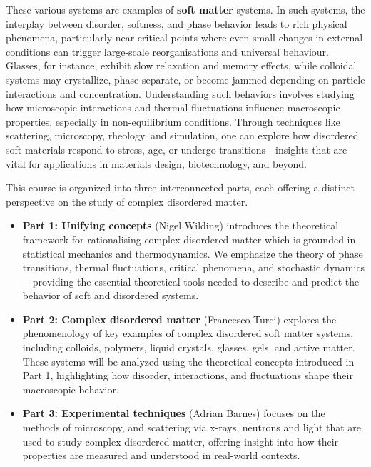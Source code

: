 \documentclass[
  letterpaper,
  DIV=11,
  numbers=noendperiod]{scrreprt}
\providecommand{\tightlist}{%
  \setlength{\itemsep}{0pt}\setlength{\parskip}{0pt}}\usepackage{longtable,booktabs,array}
\begin{document}
These various systems are examples of \textbf{soft matter} systems. In
such systems, the interplay between disorder, softness, and phase
behavior leads to rich physical phenomena, particularly near critical
points where even small changes in external conditions can trigger
large-scale reorganisations and universal behaviour. Glasses, for
instance, exhibit slow relaxation and memory effects, while colloidal
systems may crystallize, phase separate, or become jammed depending on
particle interactions and concentration. Understanding such behaviors
involves studying how microscopic interactions and thermal fluctuations
influence macroscopic properties, especially in non-equilibrium
conditions. Through techniques like scattering, microscopy, rheology,
and simulation, one can explore how disordered soft materials respond to
stress, age, or undergo transitions---insights that are vital for
applications in materials design, biotechnology, and beyond.

This course is organized into three interconnected parts, each offering
a distinct perspective on the study of complex disordered matter.

\begin{itemize}
\tightlist
\item
  \textbf{Part 1: Unifying concepts} (Nigel Wilding) introduces the
  theoretical framework for rationalising complex disordered matter
  which is grounded in statistical mechanics and thermodynamics. We
  emphasize the theory of phase transitions, thermal fluctuations,
  critical phenomena, and stochastic dynamics---providing the essential
  theoretical tools needed to describe and predict the behavior of soft
  and disordered systems.\\
\item
  \textbf{Part 2: Complex disordered matter} (Francesco Turci) explores
  the phenomenology of key examples of complex disordered soft matter
  systems, including colloids, polymers, liquid crystals, glasses, gels,
  and active matter. These systems will be analyzed using the
  theoretical concepts introduced in Part 1, highlighting how disorder,
  interactions, and fluctuations shape their macroscopic behavior.\\
\item
  \textbf{Part 3: Experimental techniques} (Adrian Barnes) focuses on
  the methods of microscopy, and scattering via x-rays, neutrons and
  light that are used to study complex disordered matter, offering
  insight into how their properties are measured and understood in
  real-world contexts.
\end{itemize}
\end{document}
